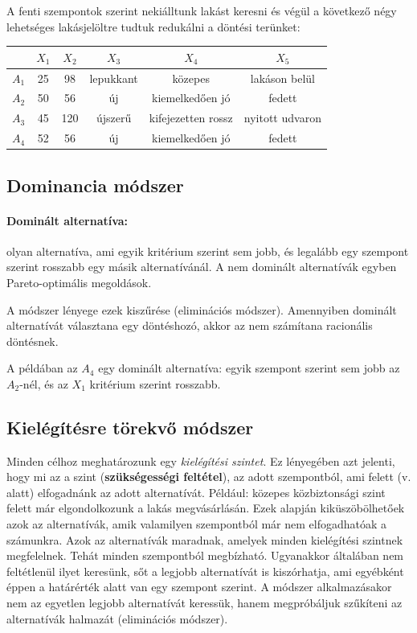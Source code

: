 \documentclass[a4paper,12pt]{article}
\begin{document}
A fenti szempontok szerint nekiálltunk lakást keresni és végül a következő négy lehetséges lakásjelöltre tudtuk redukálni a döntési terünket:
\begin{center}
\begin{tabular}{c||c|c|c|c|c}
 & $X_1$& $X_2$& $X_3$& $X_4$& $X_5$ \\
 \hline
 $A_1$&25  &98 & lepukkant & közepes & lakáson belül \\
 $A_2$&50  &56 & új& kiemelkedően jó& fedett \\
 $A_3$&45  &120 & újszerű & kifejezetten rossz& nyitott udvaron \\
 $A_4$&52  &56 & új& kiemelkedően jó& fedett \\
\end{tabular}
\end{center}

\subsection{Dominancia módszer}

\paragraph{Dominált alternatíva:} olyan alternatíva, ami egyik kritérium szerint sem jobb, és legalább egy szempont szerint rosszabb egy másik alternatívánál.  A nem dominált alternatívák egyben Pareto-optimális megoldások.

A módszer lényege ezek kiszűrése (eliminációs módszer). Amennyiben dominált alternatívát választana egy döntéshozó, akkor az nem számítana racionális döntésnek. 

A példában az $A_4$ egy dominált alternatíva: egyik szempont szerint sem jobb az $A_2$-nél, és az $X_1$ kritérium szerint rosszabb. 

\subsection{Kielégítésre törekvő módszer}

Minden célhoz meghatározunk egy \emph{kielégítési szintet}. Ez lényegében azt jelenti, hogy mi az a szint (\textbf{szükségességi feltétel}), az adott szempontból, ami felett (v. alatt) elfogadnánk az adott alternatívát. Például: közepes közbiztonsági szint felett már elgondolkozunk a lakás megvásárlásán. Ezek alapján kiküszöbölhetőek azok az alternatívák, amik valamilyen szempontból már nem elfogadhatóak a számunkra. Azok az alternatívák maradnak, amelyek minden kielégítési szintnek megfelelnek. Tehát minden szempontból megbízható. Ugyanakkor általában nem feltétlenül ilyet keresünk, sőt a legjobb alternatívát is kiszórhatja, ami egyébként éppen a határérték alatt van egy szempont szerint. A módszer alkalmazásakor nem az egyetlen legjobb alternatívát keressük, hanem megpróbáljuk szűkíteni az alternatívák halmazát (eliminációs módszer). 
\end{document}
